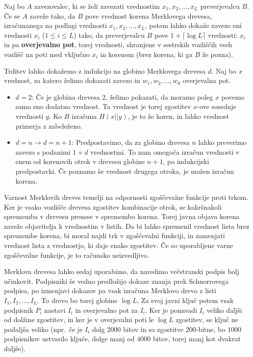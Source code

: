 \begin{trditev}
\label{trd:overjevalna_pot}
    Naj bo $A$ zavezovalec, ki se želi zavezati vrednostim $x_1, x_2, \dots, x_L$ preverjevalcu $B$. Če
    se $A$ zaveže tako, da $B$ pove vrednost korena Merklovega drevesa, izračunanega na podlagi
    vrednosti $x_1, x_2, \dots, x_L$, potem lahko dokaže zavezo eni vrednosti $x_i$ ($1 \le i \le L$)
    tako, da preverjevalcu $B$ pove $1 + \lceil \log L \rceil$ vrednosti: $x_i$ in pa \textbf{overjevalno
    pot}, torej vrednosti, shranjene v sestrskih vozliščih vseh vozlišč na poti med vključno $x_i$ in
    korenom (brez korena, ki ga $B$ že pozna).
\end{trditev}

\begin{dokaz}
    Trditev lahko dokažemo z indukcijo na globino Merklovega drevesa $d$. Naj bo $x$ vrednost, za katero
    želimo dokazati zavezo in $w_1, w_2, \dots, w_d$ overjevalna pot.
    \begin{itemize}
        \item $d = 2$: Če je globina drevesa $2$, želimo pokazati, da moramo poleg $x$ povemo samo eno
            dodatno vrednost. Ta vrednost je torej zgostitev $x$-ove sosednje vrednosti $y$. Ko $B$ izračuna
            $H(x || y)$, je to že koren, in lahko vrednost primerja z zabeleženo.
        \item $d = n \rightarrow d = n + 1$: Predpostavimo, da za globino drevesa $n$ lahko preverimo zavezo s
            podanimi $1 + d$ vrednostmi. To nam omogoča izračun vrednosti v enem od korenovih otrok v
            drevesu globine $n + 1$, po indukcijski predpostavki. Če poznamo še vrednost drugega otroka, je
            možen izračun korena.
    \end{itemize}
\end{dokaz}

Varnost Merklovih dreves temelji na odpornosti zgoščevalne funkcije proti trkom. Ker je vsako vozlišče
drevesa zgostitev kombinacije otrok, se kakršnakoli sprememba v drevesu prenese v spremembo korena.
Torej javna objava korena zaveže objavitelja k vrednostim v listih. Da bi lahko spremenil vrednost
lista brez spremembe korena, bi moral najdi trk v zgoščevalni funkciji, in zamenjati vrednost lista
z vrednostjo, ki daje enako zgostitev. Če so uporabljene varne zgoščevalne funkcije, je to računsko
neizvedljivo.

Merklova drevesa lahko sedaj uporabimo, da naredimo večstranski podpis bolj učinkovit. Podpisniki
še vedno predložijo dokaze znanja prek Schnorrovega podpisa, po izmenjavi dokazov pa vsak izračuna
Merklovo drevo z listi $I_1, I_2, \dots, I_L$. To drevo bo torej globine $\log L$. Za svoj javni
ključ potem vsak podpisnik $P_i$ nastavi $I_i$ in overjevalno pot za $I_i$. Ker je ponavadi $I_i$
veliko daljši od dolžine zgostitev, in ker je v overjevalni poti le $\log L$ zgostitev, se ključ
ne podaljša veliko (npr.\, če je $I_i$ dolg $2000$ bitov in so zgostitve $200$-bitne, bo $1000$
podpisnikov ustvarilo ključe, dolge manj od $4000$ bitov, torej manj kot dvakrat daljše).


